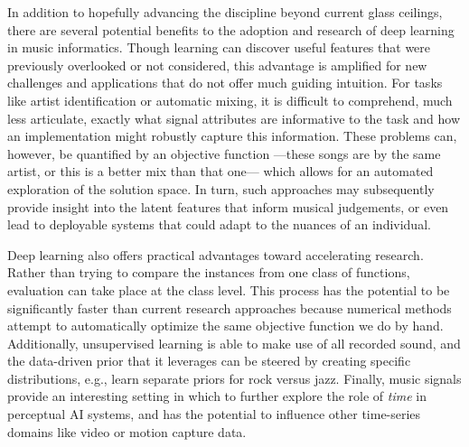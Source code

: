 In addition to hopefully advancing the discipline beyond current glass ceilings, there are several potential benefits to the adoption and research of deep learning in music informatics.
Though learning can discover useful features that were previously overlooked or not considered, this advantage is amplified for new challenges and applications that do not offer much guiding intuition.
For tasks like artist identification or automatic mixing, it is difficult to comprehend, much less articulate, exactly what signal attributes are informative to the task and how an implementation might robustly capture this information.
These problems can, however, be quantified by an objective function ---these songs are by the same artist, or this is a better mix than that one--- which allows for an automated exploration of the solution space.
In turn, such approaches may subsequently provide insight into the latent features that inform musical judgements, or even lead to deployable systems that could adapt to the nuances of an individual.

Deep learning also offers practical advantages toward accelerating research.
Rather than trying to compare the instances from one class of functions, evaluation can take place at the class level.
This process has the potential to be significantly faster than current research approaches because numerical methods attempt to automatically optimize the same objective function we do by hand.
Additionally, unsupervised learning is able to make use of all recorded sound, and the data-driven prior that it leverages can be steered by creating specific distributions, e.g., learn separate priors for rock versus jazz.
Finally, music signals provide an interesting setting in which to further explore the role of \emph{time} in perceptual AI systems, and has the potential to influence other time-series domains like video or motion capture data.

